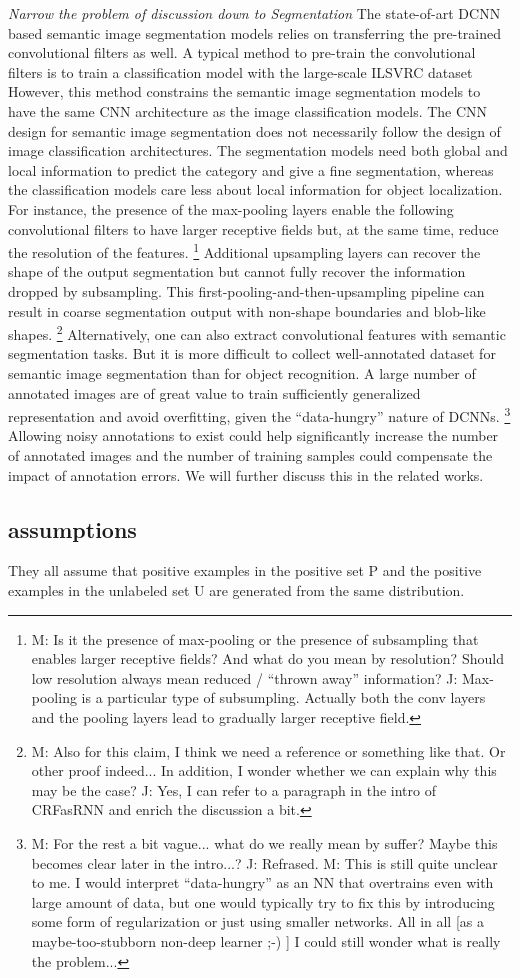 \noindent \textit{Narrow the problem of discussion down to Segmentation}
The state-of-art DCNN based semantic image segmentation models relies on transferring the pre-trained convolutional filters as well.\cite{long2015fully}
A typical method to pre-train the convolutional filters is to train a classification model with the large-scale ILSVRC dataset \cite{russakovsky2015imagenet}
However, this method constrains the semantic image segmentation models to have the same CNN architecture as the image classification models.
The CNN design for semantic image segmentation does not necessarily follow the design of image classification architectures.
The segmentation models need both global and local information to predict the category and give a fine segmentation, whereas the classification models care less about local information for object localization.
For instance, the presence of the max-pooling layers enable the following convolutional filters to have larger receptive fields but, at the same time, reduce the resolution of the features.
\footnote{M: Is it the presence of max-pooling or the presence of subsampling that enables larger receptive fields?  And what do you mean by resolution?  Should low resolution always mean reduced / ``thrown away'' information? J: Max-pooling is a particular type of subsumpling. Actually both the conv layers and the pooling layers lead to gradually larger receptive field.}
Additional upsampling layers can recover the shape of the output segmentation but cannot fully recover the information dropped by subsampling.
This first-pooling-and-then-upsampling pipeline can result in coarse segmentation output \cite{chen2016deeplab} with non-shape boundaries and blob-like shapes.
\footnote{M: Also for this claim, I think we need a reference or something like that. Or other proof indeed...  In addition, I wonder whether we can explain why this may be the case? J: Yes, I can refer to a paragraph in the intro of CRFasRNN and enrich the discussion a bit.}
\noindent
Alternatively, one can also extract convolutional features with semantic segmentation tasks.
But it is more difficult to collect well-annotated dataset for semantic image segmentation than for object recognition.
A large number of annotated images are of great value to train sufficiently generalized representation and avoid overfitting, given the ``data-hungry'' nature of DCNNs.
\footnote{M: For the rest a bit vague... what do we really mean by suffer? Maybe this becomes clear later in the intro...? J: Refrased. M: This is still quite unclear to me.  I would interpret ``data-hungry'' as an NN that overtrains even with large amount of data, but one would typically try to fix this by introducing some form of regularization or just using smaller networks.  All in all [as a maybe-too-stubborn non-deep learner  ;-)  ] I could still wonder what is really the problem...}
Allowing noisy annotations to exist could help significantly increase the number of annotated images and the number of training samples could compensate the impact of annotation errors.
We will further discuss this in the related works.

\subsection{assumptions}
They all assume that positive examples in the positive set P and the positive examples in
the unlabeled set U are generated from the same distribution.
